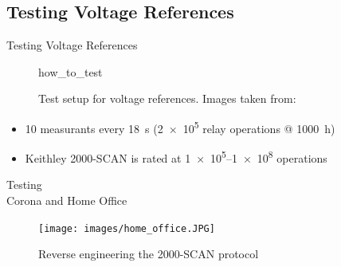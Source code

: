 \documentclass[color={accentcolor=1b}, authorontitle=true]{tudabeamer}
\begin{document}
\subsection{Testing Voltage References}
\begin{frame}{Testing Voltage References}
    \begin{figure}
        {how_to_test}
        \caption{Test setup for voltage references. Images taken from: \cite{k2002}}
    \end{figure}
    \begin{itemize}
        \item 10 measurants every \qty{18}{\second} (\num{2e5} relay operations @ \qty{1000}{\hour})
        \item Keithley 2000-SCAN is rated at \numrange{1e5}{1e8} operations
    \end{itemize}
\end{frame}

\begin{frame}{Testing \\\textnormal{\small{Corona and Home Office}}}
    \begin{figure}[h]
        \texttt{[image: images/home\_office.JPG]}
        \caption{Reverse engineering the 2000-SCAN protocol }
    \end{figure}
\end{frame}
\end{document}
